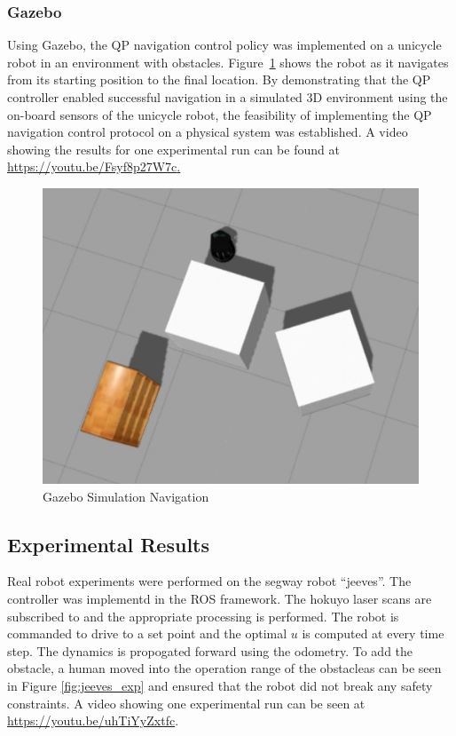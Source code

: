 \documentclass[journal]{IEEEconf}
\begin{document}
\subsubsection{Gazebo}
Using Gazebo, the QP navigation control policy was implemented on a unicycle robot in an environment with obstacles. Figure~\ref{fig:gazebo} shows the robot as it navigates from its starting position to the final location. By demonstrating that the QP controller enabled successful navigation in a simulated 3D environment using the on-board sensors of the unicycle robot, the feasibility of implementing the QP navigation control protocol on a physical system was established.
A video showing the results for one experimental run can be found at \url{https://youtu.be/Fsyf8p27W7c}\href{https://youtu.be/Fsyf8p27W7c}.
\begin{figure}[h!]
\centering
\includegraphics[scale=0.3]{Gazebo_exp.png} 
\caption{Gazebo Simulation Navigation\label{fig:gazebo}}
\end{figure}

\subsection{Experimental Results}

Real robot experiments were performed on the segway robot ``jeeves''. The controller was implementd in the ROS framework. The hokuyo laser scans are subscribed to and the appropriate processing is performed. The robot is commanded to drive to a set point and the optimal $u$ is computed at every time step. The dynamics is propogated forward using the odometry. To add the obstacle, a human moved into the operation range of the obstacleas can be seen in Figure \ref{fig:jeeves_exp} and ensured that the robot did not break any safety constraints. A video showing one experimental run can be seen at \url {https://youtu.be/uhTiYyZxtfc}.
\end{document}
